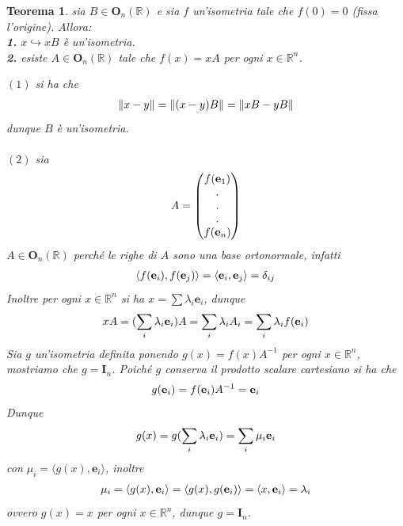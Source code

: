 \documentclass[oneside, 11pt]{amsbook}
\makeatletter
\newcommand{\0}{{(0)}}
\newcommand{\3}{{(3)}}
\theoremstyle{colonplain}
\newtheorem{thm}{Teorema}[chapter]
\theoremstyle{colondefinition}
\theoremstyle{colonremark}
\numberwithin{equation}{chapter}
\renewcommand{\proofname}{Dimostrazione}
\renewenvironment{proof}[1][\proofname]{\par
  \pushQED{\qed}%
  \normalfont \topsep6\p@\@plus6\p@\relax
  \trivlist
  \item[\hskip\labelsep\bfseries #1:]\ignorespaces
}{%
  \popQED\endtrivlist\@endpefalse
}
\makeatother
\begin{document}
\begin{thm}\label{IsomFixOrigin} sia $B \in \mathbf{O}_n(\mathbb{R})$ e sia $f$ un'isometria tale che $f(0) = 0$ (fissa l'origine). Allora: \\
\textbf{1.} $x \hookrightarrow xB$ è un'isometria. \\
\textbf{2.} esiste $A \in \mathbf{O}_n(\mathbb{R})$ tale che $f(x) = xA$ per ogni $x \in \mathbb{R}^n$. \\

\begin{proof} $(1)$ si ha che
\begin{align}
    \| x - y \| = \| (x - y)B \| = \| xB - yB \| \notag
\end{align}
dunque $B$ è un'isometria. \\ \\
$(2)$ sia
\begin{align}
    A = \begin{pmatrix}
        f(\mathbf{e}_1) \\
        . \\
        . \\
        . \\
        f(\mathbf{e}_n)
    \end{pmatrix} \notag
\end{align}
$A \in \mathbf{O}_n(\mathbb{R})$ perché le righe di $A$ sono una base ortonormale, infatti
\begin{align}
    \langle f(\mathbf{e}_i), f(\mathbf{e}_j) \rangle = \langle \mathbf{e}_i, \mathbf{e}_j \rangle = \delta_{ij} \notag
\end{align}
Inoltre per ogni $x \in \mathbb{R}^n$ si ha $x = \sum \lambda_i \mathbf{e}_i$, dunque
\begin{align}
    xA = (\sum_i \lambda_i \mathbf{e}_i)A = \sum_i \lambda_i A_i = \sum_i \lambda_i f(\mathbf{e}_i) \notag
\end{align}
Sia $g$ un'isometria definita ponendo $g(x) = f(x)A^{-1}$ per ogni $x \in \mathbb{R}^n$, mostriamo che $g = \mathbf{I}_n$. Poiché $g$ conserva il prodotto scalare cartesiano si ha che
\begin{align}
    g(\mathbf{e}_i) = f(\mathbf{e}_i)A^{-1} = \mathbf{e}_i \notag
\end{align}
Dunque
\begin{align}
    g(x) = g(\sum_i \lambda_i \mathbf{e}_i) = \sum_i \mu_i \mathbf{e}_i \notag
\end{align}
con $\mu_i = \langle g(x), \mathbf{e}_i \rangle$, inoltre
\begin{align}
    \mu_i = \langle g(x), \mathbf{e}_i \rangle = \langle g(x), g(\mathbf{e}_i) \rangle = \langle x, \mathbf{e}_i \rangle = \lambda_i \notag 
\end{align}
ovvero $g(x) = x$ per ogni $x \in \mathbb{R}^n$, dunque $g = \mathbf{I}_n$. \end{proof}
\end{thm}
\end{document}
